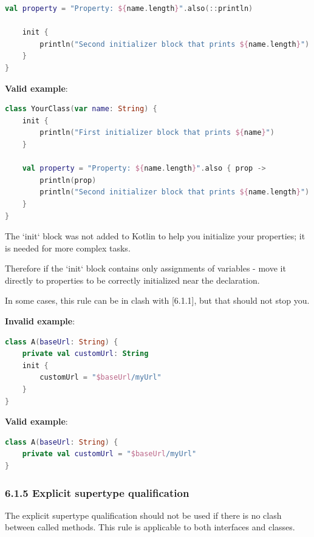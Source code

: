 {{{{\begin{lstlisting}[language=Kotlin]
    val property = "Property: ${name.length}".also(::println)
    
    init {
        println("Second initializer block that prints ${name.length}")
    }
}
\end{lstlisting}


\textbf{Valid example}:

\begin{lstlisting}[language=Kotlin]
class YourClass(var name: String) {
    init {
        println("First initializer block that prints ${name}")
    }

    val property = "Property: ${name.length}".also { prop ->
        println(prop)
        println("Second initializer block that prints ${name.length}")
    }
}
\end{lstlisting}


The `init` block was not added to Kotlin to help you initialize your properties; it is needed for more complex tasks. 

Therefore if the `init` block contains only assignments of variables - move it directly to properties to be correctly initialized near the declaration.

In some cases, this rule can be in clash with [6.1.1], but that should not stop you.



\textbf{Invalid example}:

\begin{lstlisting}[language=Kotlin]
class A(baseUrl: String) {
    private val customUrl: String
    init {
        customUrl = "$baseUrl/myUrl"
    }
}
\end{lstlisting}


\textbf{Valid example}:

\begin{lstlisting}[language=Kotlin]
class A(baseUrl: String) {
    private val customUrl = "$baseUrl/myUrl"
}
\end{lstlisting}


\subsubsection*{\textbf{6.1.5 Explicit supertype qualification}}
\leavevmode\newline

The explicit supertype qualification should not be used if there is no clash between called methods. This rule is applicable to both interfaces and classes.



}}}}
